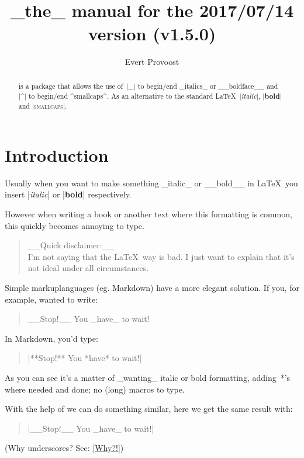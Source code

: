 \documentclass[11pt, cm-default]{l3doc}
\title{\pkg{easyformat}\\[.5em]
		\large _the_ manual for the 2017/07/14 version (v1.5.0)}
\author{Evert Provoost}
\date{}
\begin{document}
	\maketitle
	
	\begin{abstract}
		 is a package that allows the use of~|_| to begin/end
		_italics_ or __boldface__ and |^| to begin/end ^smallcaps^. As an
		alternative to the standard \LaTeX\ |\textit{italic}|, |\textbf{bold}|
		and |\textsc{smallcaps}|.
	\end{abstract}

	\tableofcontents
	\newpage


	\section{Introduction}
	Usually when you want to make something _italic_ or __bold__ in \LaTeX\ you
	insert |\textit{italic}| or |\textbf{bold}| respectively.
	
	However when writing a book or another text where this formatting is common,
	this quickly becomes annoying to type.

	\begin{quote}
	__Quick disclaimer:__\\
	I'm not saying that the \LaTeX\ way is bad. I just want to explain that it's
	not ideal under all circumstances.
	\end{quote}
	
	Simple markuplanguages (eg. Markdown) have a more elegant solution.	
	If you, for example, wanted to write:
	\begin{quote}
		__Stop!__ You _have_ to wait!
	\end{quote}

	In Markdown, you'd type:
	\begin{quote}
		|**Stop!** You *have* to wait!|
	\end{quote}

	As you can see it's a matter of _wanting_ italic or bold formatting, adding~*'s
	where needed and done; no (long) macros to type.
	
	With the help of  we can do something similar, here we get the
	same result with:
	\begin{quote}
		|__Stop!__ You _have_ to wait!|
	\end{quote}
	
	(Why underscores? See: \ref{Why?!})\\
	
\end{document}
